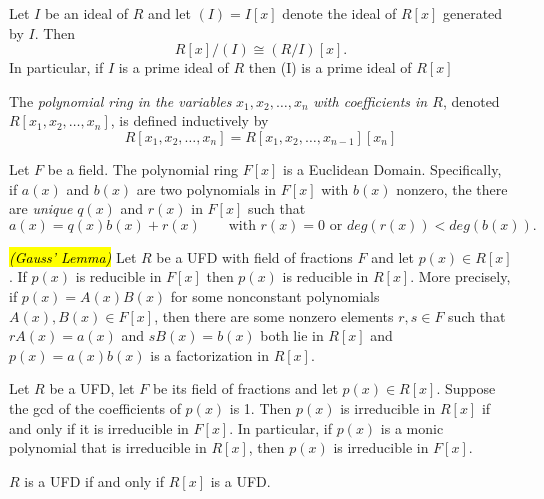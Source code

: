 \begin{prop}
Let $I$ be an ideal of $R$ and let $(I) = I[x]$ denote the ideal of $R[x]$ generated by $I$. Then 
\[R[x]/(I) \cong (R/I)[x].\]
In particular, if $I$ is a prime ideal of $R$ then (I) is a prime ideal of $R[x]$
\end{prop}

\nl

\begin{defn}
The \textit{polynomial ring in the variables} $x_1,x_2,\ldots,x_n$ \textit{with coefficients in $R$}, denoted $R[x_1,x_2,\ldots,x_n]$, is defined inductively by
\[R[x_1,x_2,\ldots,x_n] = R[x_1,x_2,\ldots,x_{n-1}][x_n]\]
\end{defn}

\nl

\begin{thm}
Let $F$ be a field. The polynomial ring $F[x]$ is a Euclidean Domain. Specifically, if $a(x)$ and $b(x)$ are two polynomials in $F[x]$ with $b(x)$ nonzero, the there are \textit{unique} $q(x)$ and $r(x)$ in $F[x]$ such that
\[a(x) = q(x)b(x) + r(x)\qquad\text{with } r(x) = 0\text{ or } deg(r(x))<deg(b(x)).\]
\end{thm}

\nl

\begin{prop}\hl{\textit{(Gauss' Lemma)}} Let $R$ be a UFD with field of fractions $F$ and let $p(x)\in R[x]$. If $p(x)$ is reducible in $F[x]$ then $p(x)$ is reducible in $R[x]$. More precisely, if $p(x) = A(x)B(x)$ for some nonconstant polynomials $A(x),B(x)\in F[x]$, then there are some nonzero elements $r,s\in F$ such that $rA(x) = a(x)$ and $sB(x) = b(x)$ both lie in $R[x]$ and $p(x) = a(x)b(x)$ is a factorization in $R[x]$.
\end{prop}

\nl

\begin{cor}
Let $R$ be a UFD, let $F$ be its field of fractions and let $p(x)\in R[x]$. Suppose the gcd of the coefficients of $p(x)$ is 1. Then $p(x)$ is irreducible in $R[x]$ if and only if it is irreducible in $F[x]$. In particular, if $p(x)$ is a monic polynomial that is irreducible in $R[x]$, then $p(x)$ is irreducible in $F[x]$.
\end{cor}

\nl

\begin{thm}
$R$ is a UFD if and only if $R[x]$ is a UFD.
\end{thm}

